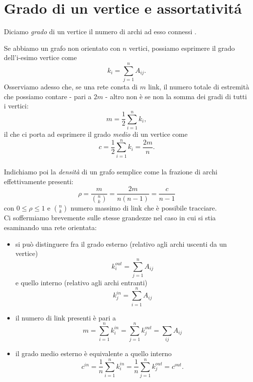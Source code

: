 \section{Grado di un vertice e assortativit\'{a}}
\begin{definizione}
Diciamo \emph{grado} di un vertice il numero di archi ad esso connessi \cite{Lesniak}.
\end{definizione}
Se abbiamo un grafo non orientato con $ n $ vertici, possiamo esprimere il grado dell'i-esimo vertice come
\begin{equation}
	k_i = \sum_{j=1}^n A_{ij}.
\end{equation}
Osserviamo adesso che, se una rete consta di $ m $ link, il numero totale di estremità che possiamo contare - pari a $ 2m $ - altro non è se non la somma dei gradi di tutti i vertici: 
\begin{equation}
	m = \frac{1}{2} \sum_{i=1}^n k_i,
\end{equation}
il che ci porta ad esprimere il grado \emph{medio} di un vertice come 
\begin{equation}
 	c = \frac{1}{2} \sum_{i=1}^n k_i = \frac{2m}{n}. 
\end{equation}
 \\Indichiamo poi la \emph{densità} di un grafo semplice come la frazione di archi effettivamente presenti:
\begin{equation}
	\rho = \frac{m}{\binom{n}{k}} = \frac{2m}{n\left(n-1 \right)} = \frac{c}{n-1}
\end{equation}
con $ 0 \leq \rho \leq  1 $ e  $ \binom{n}{k} $  numero massimo di link che è possibile tracciare. \\Ci soffermiamo brevemente sulle stesse grandezze nel caso in cui si stia esaminando una rete orientata:
\begin{itemize}
\item si può distinguere fra il grado esterno (relativo agli archi uscenti da un vertice)
	\begin{equation}
		k_{i}^{out} = \sum_{j=1}^n A_{ij}	
	\end{equation}
e quello interno (relativo agli archi entranti)
	\begin{equation}
		k_{j}^{in} = \sum_{i=1}^n A_{ij}
	\end{equation}
\item il numero di link presenti è pari a
	\begin{equation}
		m = \sum_{i=1}^n k_i^{in} = \sum_{j=1}^n k_j^{out} = \sum_{ij} A_{ij}
	\end{equation}
\item il grado medio esterno è equivalente a quello interno
	\begin{equation}
		c^{in} = \frac{1}{n} \sum_{i=1}^n k_i^{in} = \frac{1}{n} \sum_{j=1}^n k_j^{out} = c^{out}.
	\end{equation}
\end{itemize}
